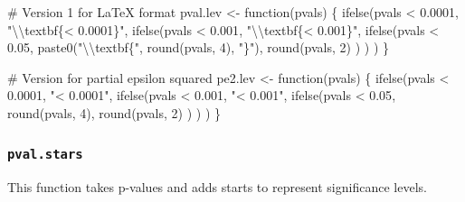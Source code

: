 \documentclass[
  bookmarksnumbered]{article}
\newenvironment{Shaded}{\begin{snugshade}}{\end{snugshade}}
\newcommand{\CommentTok}[1]{\textcolor[rgb]{0.50,0.62,0.50}{#1}}
\newcommand{\ControlFlowTok}[1]{\textcolor[rgb]{0.94,0.87,0.69}{#1}}
\newcommand{\DecValTok}[1]{\textcolor[rgb]{0.86,0.86,0.80}{#1}}
\newcommand{\FloatTok}[1]{\textcolor[rgb]{0.75,0.75,0.82}{#1}}
\newcommand{\FunctionTok}[1]{\textcolor[rgb]{0.94,0.94,0.56}{#1}}
\newcommand{\NormalTok}[1]{\textcolor[rgb]{0.80,0.80,0.80}{#1}}
\newcommand{\OtherTok}[1]{\textcolor[rgb]{0.94,0.94,0.56}{#1}}
\newcommand{\SpecialCharTok}[1]{\textcolor[rgb]{0.86,0.64,0.64}{#1}}
\newcommand{\StringTok}[1]{\textcolor[rgb]{0.80,0.58,0.58}{#1}}
\begin{document}
\begin{Shaded}
\begin{Highlighting}[]
\CommentTok{\# Version 1 for LaTeX format}
\NormalTok{pval.lev }\OtherTok{\textless{}{-}} \ControlFlowTok{function}\NormalTok{(pvals) \{}
  \FunctionTok{ifelse}\NormalTok{(pvals }\SpecialCharTok{\textless{}} \FloatTok{0.0001}\NormalTok{, }\StringTok{"}\SpecialCharTok{\textbackslash{}\textbackslash{}}\StringTok{textbf\{\textless{} 0.0001\}"}\NormalTok{,}
    \FunctionTok{ifelse}\NormalTok{(pvals }\SpecialCharTok{\textless{}} \FloatTok{0.001}\NormalTok{, }\StringTok{"}\SpecialCharTok{\textbackslash{}\textbackslash{}}\StringTok{textbf\{\textless{} 0.001\}"}\NormalTok{,}
      \FunctionTok{ifelse}\NormalTok{(pvals }\SpecialCharTok{\textless{}} \FloatTok{0.05}\NormalTok{, }\FunctionTok{paste0}\NormalTok{(}\StringTok{"}\SpecialCharTok{\textbackslash{}\textbackslash{}}\StringTok{textbf\{"}\NormalTok{, }\FunctionTok{round}\NormalTok{(pvals, }\DecValTok{4}\NormalTok{), }\StringTok{"\}"}\NormalTok{),}
        \FunctionTok{round}\NormalTok{(pvals, }\DecValTok{2}\NormalTok{)}
\NormalTok{      )}
\NormalTok{    )}
\NormalTok{  )}
\NormalTok{\}}


\CommentTok{\# Version for partial epsilon squared}
\NormalTok{pe2.lev }\OtherTok{\textless{}{-}} \ControlFlowTok{function}\NormalTok{(pvals) \{}
  \FunctionTok{ifelse}\NormalTok{(pvals }\SpecialCharTok{\textless{}} \FloatTok{0.0001}\NormalTok{, }\StringTok{"\textless{} 0.0001"}\NormalTok{,}
    \FunctionTok{ifelse}\NormalTok{(pvals }\SpecialCharTok{\textless{}} \FloatTok{0.001}\NormalTok{, }\StringTok{"\textless{} 0.001"}\NormalTok{,}
      \FunctionTok{ifelse}\NormalTok{(pvals }\SpecialCharTok{\textless{}} \FloatTok{0.05}\NormalTok{, }\FunctionTok{round}\NormalTok{(pvals, }\DecValTok{4}\NormalTok{),}
        \FunctionTok{round}\NormalTok{(pvals, }\DecValTok{2}\NormalTok{)}
\NormalTok{      )}
\NormalTok{    )}
\NormalTok{  )}
\NormalTok{\}}
\end{Highlighting}
\end{Shaded}

\subsubsection{\texorpdfstring{\texttt{pval.stars}}{pval.stars}}\label{pval.stars}

This function takes p-values and adds starts to represent significance levels.
\end{document}
